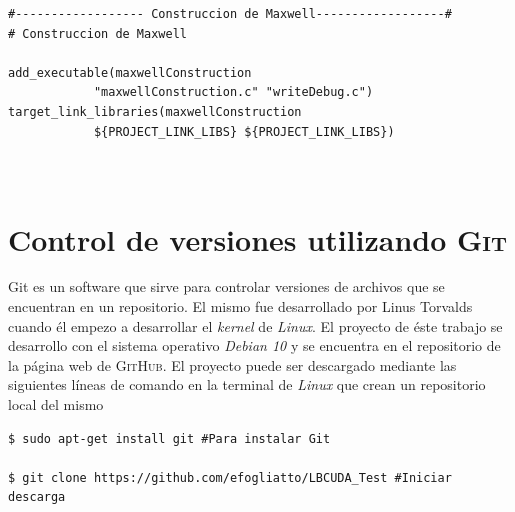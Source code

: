 {\footnotesize
	\begin{frame}{}
		\begin{lstlisting}[frame=single]
#------------------ Construccion de Maxwell------------------#
# Construccion de Maxwell

add_executable(maxwellConstruction 
			"maxwellConstruction.c" "writeDebug.c")
target_link_libraries(maxwellConstruction 
			${PROJECT_LINK_LIBS} ${PROJECT_LINK_LIBS})

		
		\end{lstlisting}
		
	\end{frame}
}

\newpage
\section{Control de versiones utilizando \textsc{Git}}
\label{sec:git}

Git es un software que sirve para controlar versiones de archivos que se encuentran en un repositorio. El mismo fue desarrollado por Linus Torvalds cuando él empezo a desarrollar el \textit{kernel} de \textit{Linux}. El proyecto de éste trabajo se desarrollo con el sistema operativo \textit{Debian 10} y se encuentra en el repositorio de la página web de \textsc{GitHub}. El proyecto puede ser descargado mediante las siguientes líneas de comando en la terminal de \textit{Linux} que crean un repositorio local del mismo
{\footnotesize
	\begin{frame}{}
		\begin{lstlisting}
$ sudo apt-get install git #Para instalar Git

$ git clone https://github.com/efogliatto/LBCUDA_Test #Iniciar descarga 
		\end{lstlisting}
		
	\end{frame}
}

